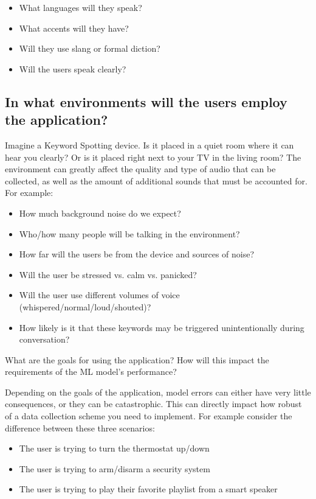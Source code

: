 \begin{itemize}
  \item What languages will they speak? 
  \item What accents will they have? 
  \item Will they use slang or formal diction?
  \item Will the users speak clearly?
\end{itemize}

\subsection{In what environments will the users employ the application?}

Imagine a Keyword Spotting device. Is it placed in a quiet room where it can hear you clearly? Or is it placed right next to your TV in the living room? The environment can greatly affect the quality and type of audio that can be collected, as well as the amount of additional sounds that must be accounted for. For example:

\begin{itemize}
  \item How much background noise do we expect?
  \item Who/how many people will be talking in the environment?
  \item How far will the users be from the device and sources of noise?
  \item Will the user be stressed vs. calm vs. panicked?
  \item Will the user use different volumes of voice (whispered/normal/loud/shouted)?
  \item How likely is it that these keywords may be triggered unintentionally during conversation?
\end{itemize}

What are the goals for using the application? How will this impact the requirements of the ML model's performance?

\bigskip

Depending on the goals of the application, model errors can either have very little consequences, or they can be catastrophic. This can directly impact how robust of a data collection scheme you need to implement. For example consider the difference between these three scenarios:

\begin{itemize}
  \item The user is trying to turn the thermostat up/down
  \item The user is trying to arm/disarm a security system
  \item The user is trying to play their favorite playlist from a smart speaker
\end{itemize}

